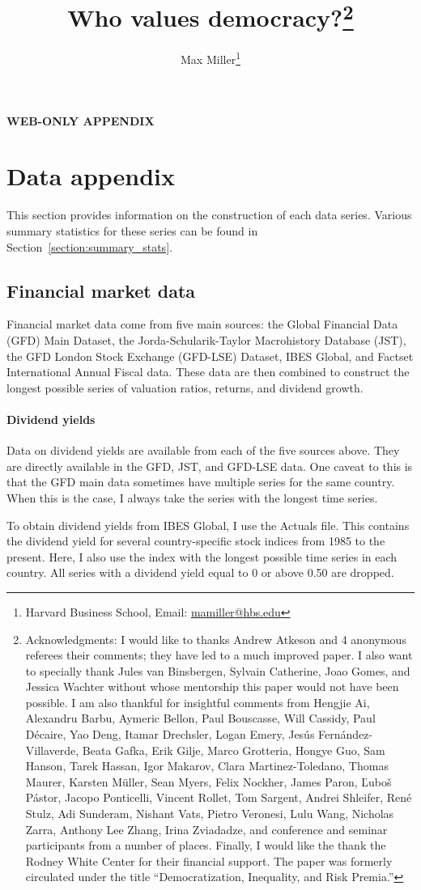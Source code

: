 \documentclass[12pt]{article}
\title{Who values democracy?\thanks{Acknowledgments: I would like to thanks Andrew Atkeson and 4 anonymous referees their comments; they have led to a much improved paper.  I also want to specially thank Jules van Binsbergen, Sylvain Catherine, Joao Gomes, and Jessica Wachter without whose mentorship this paper would not have been possible. I am also thankful for insightful comments from Hengjie Ai, Alexandru Barbu, Aymeric Bellon, Paul Bouscasse, Will Cassidy, Paul D\'{e}caire, Yao Deng,  Itamar Drechsler, Logan Emery, Jes\'{u}s Fern\'{a}ndez-Villaverde,  Beata Gafka, Erik Gilje,  Marco Grotteria, Hongye Guo, Sam Hanson, Tarek Hassan, Igor Makarov, Clara Martinez-Toledano, Thomas Maurer, Karsten M\"{u}ller, Sean Myers, Felix Nockher, James Paron, \v{L}ubo\v{s} P\'{a}stor,  Jacopo Ponticelli, Vincent Rollet, Tom Sargent, Andrei Shleifer, Ren\'{e} Stulz, Adi Sunderam, Nishant Vats, Pietro Veronesi, Lulu Wang, Nicholas Zarra, Anthony Lee Zhang, Irina Zviadadze, and conference and seminar participants from a number of places. Finally, I would like the thank the Rodney White Center for their financial support. The paper was formerly circulated under the title ``Democratization, Inequality, and Risk Premia.''}}
\author{Max Miller\thanks{Harvard Business School, Email: \href{mailto:mamiller@hbs.edu}{mamiller@hbs.edu}}	
}
\numberwithin{equation}{section}
\begin{document}
\hypersetup{linkcolor=blue}

\renewcommand{\baselinestretch}{1.3}\normalsize
\newpage
\clearpage
{}

\renewcommand{\baselinestretch}{1.3}\normalsize
\appendix
\setcounter{table}{0}
\setcounter{figure}{0}
\renewcommand\thetable{\Alph{section}.\arabic{table}}
\renewcommand\thefigure{\Alph{section}.\arabic{figure}}
\begin{center}
	\vspace*{5mm}
	\Large{\textbf{WEB-ONLY APPENDIX}\\}
	\vspace*{5mm}
\end{center}


\section{Data appendix}\label{section:dataAppendix}

This section provides information on the construction of each data series. Various summary statistics for these series can be found in Section~\ref{section:summary_stats}.

\subsection{Financial market data}\label{section:equity_app}

Financial market data come from five main sources: the Global Financial Data (GFD) Main Dataset, the Jorda-Schularik-Taylor Macrohistory Database (JST), the GFD London Stock Exchange (GFD-LSE) Dataset, IBES Global, and Factset International Annual Fiscal data.  These data are then combined to construct the longest possible series of valuation ratios, returns, and dividend growth.

\paragraph{Dividend yields}
Data on dividend yields are available from each of the five sources above.  They are directly available in the GFD, JST, and GFD-LSE data. One caveat to this is that the GFD main data sometimes have multiple series for the same country. When this is the case, I always take the series with the longest time series.

To obtain dividend yields from IBES Global, I use the Actuals file. This contains the dividend yield for several country-specific stock indices from 1985 to the present. Here, I also use the index with the longest possible time series in each country.  All series with a dividend yield equal to 0 or above 0.50 are dropped. 
\end{document}
